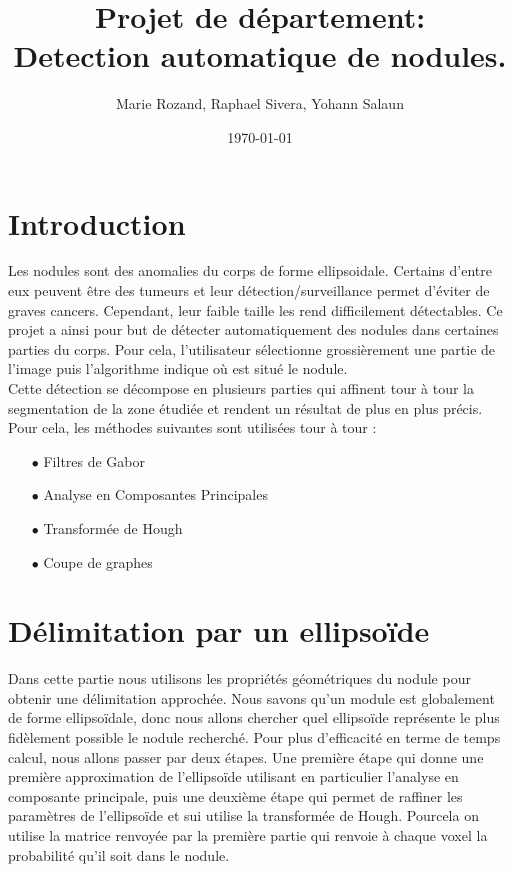 \documentclass{article}
\title{Projet de département: \\ Detection automatique de nodules.}
\author{Marie Rozand, Raphael Sivera, Yohann Salaun}
\date{\today}
\begin{document}
\maketitle

\section*{Introduction}

Les nodules sont des anomalies du corps de forme ellipsoidale. Certains d'entre eux peuvent être des tumeurs et leur détection/surveillance permet d'éviter de graves cancers. Cependant, leur faible taille les rend difficilement détectables. Ce projet a ainsi pour but de détecter automatiquement des nodules dans certaines parties du corps. Pour cela, l'utilisateur sélectionne grossièrement une partie de l'image puis l'algorithme indique où est situé le nodule. \\
Cette détection se décompose en plusieurs parties qui affinent tour à tour la segmentation de la zone étudiée et rendent un résultat de plus en plus précis. Pour cela, les méthodes suivantes sont utilisées tour à tour :
\begin{itemize}
	\item[$\bullet$]Filtres de Gabor
	\item[$\bullet$]Analyse en Composantes Principales
	\item[$\bullet$]Transformée de Hough
	\item[$\bullet$]Coupe de graphes
\end{itemize}

\section{Délimitation par un ellipsoïde}

Dans cette partie nous utilisons les propriétés géométriques du nodule pour obtenir une délimitation approchée. Nous savons qu'un module est globalement de forme ellipsoïdale, donc nous allons chercher quel ellipsoïde représente le plus fidèlement possible le nodule recherché. Pour plus d'efficacité en terme de temps calcul, nous allons passer par deux étapes. Une première étape qui donne une première approximation de l'ellipsoïde utilisant en particulier l'analyse en composante principale, puis une deuxième étape qui permet de raffiner les paramètres de l'ellipsoïde et sui utilise la transformée de Hough. Pourcela on utilise la matrice renvoyée par la première partie qui renvoie à chaque voxel la probabilité qu'il soit dans le nodule.
\end{document}
